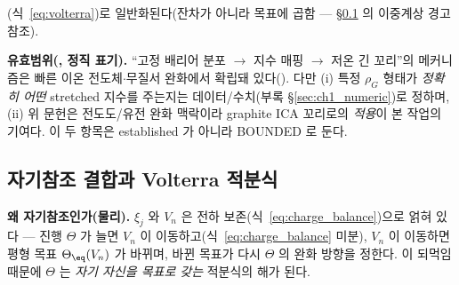 (식~\eqref{eq:volterra})로 일반화된다(잔차가 아니라 목표에 곱함 — \S\ref{sec:volterra} 의 이중계상 경고 참조).
\begin{boundbox}
\textbf{유효범위(, 정직 표기).} ``고정 배리어 분포 $\to$ 지수 매핑 $\to$ 저온 긴 꼬리''의 메커니즘은
빠른 이온 전도체$\cdot$무질서 완화에서 확립돼 있다(\cite{svare2000,johnston2006,lindsey1980}). 다만 (i)
특정 $\rho_G$ 형태가 \emph{정확히 어떤} stretched 지수를 주는지는 데이터/수치(부록 \S\ref{sec:ch1_numeric})로 정하며, (ii) 위
문헌은 전도도/유전 완화 맥락이라 graphite ICA 꼬리로의 \emph{적용}이 본 작업의 기여다. 이 두 항목은
established 가 아니라 BOUNDED 로 둔다.
\end{boundbox}

\subsection{자기참조 결합과 Volterra 적분식}\label{sec:volterra}
\textbf{왜 자기참조인가(물리).} $\xi_j$ 와 $V_n$ 은 전하 보존(식~\eqref{eq:charge_balance})으로 얽혀 있다 — 진행
$\Theta$ 가 늘면 $V_n$ 이 이동하고(식~\eqref{eq:charge_balance} 미분), $V_n$ 이 이동하면 평형 목표
$\Theta_\eq(V_n)$ 가 바뀌며, 바뀐 목표가 다시 $\Theta$ 의 완화 방향을 정한다. 이 되먹임 때문에 $\Theta$ 는 \emph{자기
자신을 목표로 갖는} 적분식의 해가 된다.


